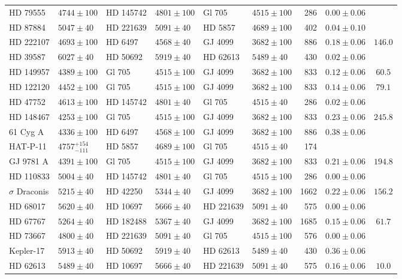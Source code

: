 \begin{tiny}
\begin{longtable}{ll|ll|ll|rcc}
HD 79555 & $4744 \pm 100$ & HD 145742 & $4801 \pm 100$ & Gl 705 & $4515 \pm 100$ & 286 & $0.00 \pm 0.06$ &  \\
HD 87884 & $5047 \pm 40$ & HD 221639 & $5091 \pm 40$ & HD 5857 & $4689 \pm 100$ & 402 & $0.04 \pm 0.10$ &  \\
HD 222107 & $4693 \pm 100$ & HD 6497 & $4568 \pm 40$ & GJ 4099 & $3682 \pm 100$ & 886 & $0.18 \pm 0.06$ & $146.0$ \\
HD 39587 & $6027 \pm 40$ & HD 50692 & $5919 \pm 40$ & HD 62613 & $5489 \pm 40$ & 430 & $0.02 \pm 0.06$ &  \\
HD 149957 & $4389 \pm 100$ & Gl 705 & $4515 \pm 100$ & GJ 4099 & $3682 \pm 100$ & 833 & $0.12 \pm 0.06$ & $60.5$ \\
HD 122120 & $4452 \pm 100$ & Gl 705 & $4515 \pm 100$ & GJ 4099 & $3682 \pm 100$ & 833 & $0.14 \pm 0.06$ & $79.1$ \\
HD 47752 & $4613 \pm 100$ & HD 145742 & $4801 \pm 40$ & Gl 705 & $4515 \pm 40$ & 286  & $0.02 \pm 0.06$ &  \\
HD 148467 & $4253 \pm 100$ & Gl 705 & $4515 \pm 100$ & GJ 4099 & $3682 \pm 100$ & 833 & $0.23 \pm 0.06$ & $245.8$ \\
61 Cyg A & $4336 \pm 100$ & HD 6497 & $4568 \pm 100$ & GJ 4099 & $3682 \pm 100$ & 886 & $0.38 \pm 0.06$ &  \\
HAT-P-11 & $4757^{+154}_{-111}$ & HD 5857 & $4689 \pm 100$ & Gl 705 & $4515 \pm 40$ & 174 &  &  \\
GJ 9781 A & $4391 \pm 100$ & Gl 705 & $4515 \pm 100$ & GJ 4099 & $3682 \pm 100$ & 833 & $0.21 \pm 0.06$ & $194.8$ \\
HD 110833 & $5004 \pm 40$ & HD 145742 & $4801 \pm 40$ & Gl 705 & $4515 \pm 100$ & 286 & $0.00 \pm 0.06$ &  \\
$\sigma$ Draconis & $5215 \pm 40$ & HD 42250 & $5344 \pm 40$ & GJ 4099 & $3682 \pm 100$ & 1662 & $0.22 \pm 0.06$ & $156.2$ \\
HD 68017 & $5620 \pm 40$ & HD 10697 & $5666 \pm 40$ & HD 221639 & $5091 \pm 40$ & 575 & $0.00 \pm 0.06$ &  \\
HD 67767 & $5264 \pm 40$ & HD 182488 & $5367 \pm 40$ & GJ 4099 & $3682 \pm 100$ & 1685 & $0.15 \pm 0.06$ & $61.7$ \\
HD 73667 & $4800 \pm 40$ & HD 221639 & $5091 \pm 40$ & Gl 705 & $4515 \pm 100$ & 576 & $0.00 \pm 0.06$ &  \\
Kepler-17 & $5913 \pm 40$ & HD 50692 & $5919 \pm 40$ & HD 62613 & $5489 \pm 40$ & 430 & $0.36 \pm 0.06$ &  \\
HD 62613 & $5489 \pm 40$ & HD 10697 & $5666 \pm 40$ & HD 221639 & $5091 \pm 40$ & 575 & $0.16 \pm 0.06$ & $10.0$ \\

\end{longtable}
\end{tiny}
